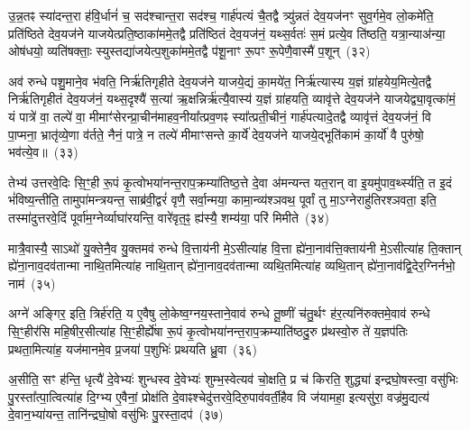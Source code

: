 उ॒न्न॒तꣴ स्या॑दन्त॒रा ह॑वि॒र्धानं॑ च॒ सद॑श्चान्त॒रा सद॑श्च॒ गार्\mbox{}ह॑पत्यं चै॒तद्वै त्र्यु॑न्नतं देव॒यज॑नꣳ सुव॒र्गमे॒व लो॒कमे॑ति॒ प्रति॑ष्ठिते देव॒यज॑ने याजयेत्प्रति॒ष्ठाका॑ममे॒तद्वै प्रति॑ष्ठितं देव॒यज॑नं॒ यथ्स॒र्वतः॑ स॒मं प्रत्ये॒व ति॑ष्ठति॒ यत्रा॒न्याअ॑न्या॒ ओष॑धयो॒ व्यति॑षक्ताः॒ स्युस्तद्या॑जयेत्प॒शुका॑ममे॒तद्वै प॑शू॒नाꣳ रू॒पꣳ रू॒पेणै॒वास्मै॑ प॒शून्~(३२)

अव॑ रुन्धे पशु॒माने॒व भ॑वति॒ निर्\mbox{}ऋ॑तिगृहीते देव॒यज॑ने याजये॒द्यं का॒मये॑त॒ निर्\mbox{}ऋ॑त्यास्य य॒ज्ञं ग्रा॑हयेय॒मित्ये॒तद्वै निर्\mbox{}ऋ॑तिगृहीतं देव॒यज॑नं॒ यथ्स॒दृश्यै॑ स॒त्या॑ ऋ॒क्षन्निर्\mbox{}ऋ॑त्यै॒वास्य॑ य॒ज्ञं ग्रा॑हयति॒ व्यावृ॑त्ते देव॒यज॑ने याजयेद्व्या॒वृत्का॑मं॒ यं पात्रे॑ वा॒ तल्पे॑ वा॒ मीमाꣳ॑सेरन्प्रा॒चीन॑माहव॒नीया᳚त्प्रव॒णꣴ स्या᳚त्प्रती॒चीनं॒ गार्\mbox{}ह॑पत्यादे॒तद्वै व्यावृ॑त्तं देव॒यज॑नं॒ वि पा॒प्मना॒ भ्रातृ॑व्ये॒णा व॑र्तते॒ नैनं॒ पात्रे॒ न तल्पे॑ मीमाꣳसन्ते का॒र्ये॑ देव॒यज॑ने याजये॒द्भूति॑कामं का॒र्यो॑ वै पुरु॑षो॒ भव॑त्ये॒व॥~(३३)

{\anuvakamend[{यात॒वै ह॑वि॒र्धान॑ञ्च प॒शून्पा॒प्मना॒\-ऽष्टाद॑श च}]}%

तेभ्य॑ उत्तरवे॒दिः सि॒ꣳ॒ही रू॒पं कृ॒त्वोभया॑नन्त॒राप॒क्रम्या॑तिष्ठ॒त्ते दे॒वा अ॑मन्यन्त यत॒रान् वा इ॒यमु॑पाव॒र्थ्स्यति॒ त इ॒दं भं॑विष्य॒न्तीति॒ तामुपा॑मन्त्रयन्त॒ साब्र॑वी॒द्वरं॑ वृणै॒ सर्वा॒न्मया॒ कामा॒न्व्य॑श्ञवथ॒ पूर्वां तु मा॒\-ऽग्नेराहु॑तिरश्ञवता॒ इति॒ तस्मा॑दुत्तरवे॒दिं पूर्वा॑म॒ग्नेर्व्याघा॑रयन्ति॒ वारे॑वृत॒ꣴ॒ ह्य॑स्यै॒ शम्य॑या॒ परि॑ मिमीते~(३४)

मात्रै॒वास्यै॒ सा\-ऽथो॑ यु॒क्तेनै॒व यु॒क्तमव॑ रुन्धे वि॒त्ताय॑नी मे॒\-ऽसीत्या॑ह वि॒त्ता ह्ये॑ना॒नाव॑त्ति॒क्ताय॑नी मे॒\-ऽसीत्या॑ह ति॒क्तान् ह्ये॑ना॒नाव॒दव॑तान्मा नाथि॒तमित्या॑ह नाथि॒तान् ह्ये॑ना॒नाव॒दव॑तान्मा व्यथि॒तमित्या॑ह व्यथि॒तान् ह्ये॑ना॒नाव॑द्वि॒देर॒ग्निर्नभो॒ नाम॑~(३५)

अग्ने॑ अङ्गिर॒ इति॒ त्रिर्\mbox{}ह॑रति॒ य ए॒वैषु लो॒केष्व॒ग्नय॒स्ताने॒वाव॑ रुन्धे तू॒ष्णीं च॑तु॒र्थꣳ ह॑र॒त्यनि॑रुक्तमे॒वाव॑ रुन्धे सि॒ꣳ॒हीर॑सि महि॒षीर॒सीत्या॑ह सि॒ꣳ॒हीर्\mbox{}ह्ये॑षा रू॒पं कृ॒त्वोभया॑नन्त॒राप॒क्रम्याति॑ष्ठदु॒रु प्र॑थस्वो॒रु ते॑ य॒ज्ञप॑तिः प्रथता॒मित्या॑ह॒ यज॑मानमे॒व प्र॒जया॑ प॒शुभिः॑ प्रथयति ध्रु॒वा~(३६)

अ॒सीति॒ सꣳ ह॑न्ति॒ धृत्यै॑ दे॒वेभ्यः॑ शुन्धस्व दे॒वेभ्यः॑ शुम्भ॒स्वेत्यव॑ चो॒क्षति॒ प्र च॑ किरति॒ शुद्ध्या॑ इन्द्रघो॒षस्त्वा॒ वसु॑भिः पु॒रस्ता᳚त्पा॒त्वित्या॑ह दि॒ग्भ्य ए॒वैनां॒ प्रोक्ष॑ति दे॒वाꣴश्चेदु॑त्तरवे॒दिरु॒पाव॑वर्ती॒हैव वि ज॑यामहा॒ इत्यसु॑रा॒ वज्र॑मु॒द्यत्य॑ दे॒वान॒भ्या॑यन्त॒ तानि॑न्द्रघो॒षो वसु॑भिः पु॒रस्ता॒दप॑~(३७)

